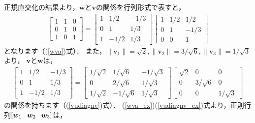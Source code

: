\documentclass[dvipdfmx]{jsarticle}
\theoremstyle{definition}
\newcommand{\hs}[1]{\hspace{#1em}}
\newcommand{\hv}[3]{[#1 \hs{0.8} #2 \hs{0.8} #3]}
\begin{document}
正規直交化の結果より，$\bm{w}$と$\bm{v}$の関係を行列形式で表すと，
\begin{align}
    \begin{bmatrix}
        1 & 1 & 0 \\
        0 & 1 & 0 \\
        1 & 0 & 1
    \end{bmatrix}
    = \begin{bmatrix}
        1 & 1/2 & -1/3 \\
        0 & 1 & 1/3 \\
        1 & -1/2 & 1/3
    \end{bmatrix}
    \begin{bmatrix}
        1 & 1/2 & 1/2 \\
        0 & 1 & -1/3 \\
        0 & 0 & 1
    \end{bmatrix}
    \label{wva_ex}
\end{align}
となります（(\ref{wva})式）．
また，$\| \bm{v}_1 \| = \sqrt{2}, \| \bm{v}_2 \| = 3/\sqrt{6}, \| \bm{v}_3 \| = 1/\sqrt{3}$より，
$\bm{v}$と$\bm{w}$は，
\begin{align}
    \begin{bmatrix}
        1 & 1/2 & -1/3 \\
        0 & 1 & 1/3 \\
        1 & -1/2 & 1/3
    \end{bmatrix}
    = \begin{bmatrix}
        1/\sqrt{2} & 1/\sqrt{6} & -1/\sqrt{3} \\
        0 & 2/\sqrt{6} & 1/\sqrt{3} \\
        1/\sqrt{2} & -1/\sqrt{6} & 1/\sqrt{3}
    \end{bmatrix}
    \begin{bmatrix}
        \sqrt{2} & 0 & 0 \\
        0 & 3/\sqrt{6} & 0 \\
        0 & 0 & 1/\sqrt{3}
    \end{bmatrix}
    \label{vudiagnv_ex}
\end{align}
の関係を持ちます（(\ref{vudiagnv})式）．
(\ref{wva_ex})(\ref{vudiagnv_ex})式より，正則行列$\hv{\bm{w}_1}{\bm{w}_2}{\bm{w}_3}$は，
\end{document}
